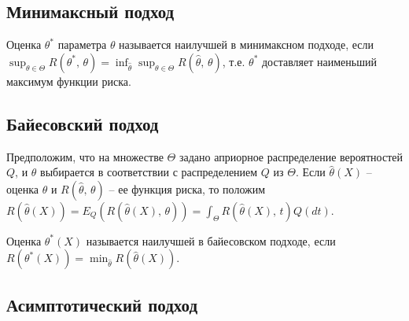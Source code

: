     \subsection{Минимаксный подход}
    \begin{definition}
    Оценка $\displaystyle \theta ^{*}$ параметра $\displaystyle \theta $ называется наилучшей в минимаксном подходе, если $\displaystyle \sup _{\theta \in \Theta } R\left( \theta ^{*} ,\, \theta \right) =\inf_{\hat{\theta }}\sup _{\theta \in \Theta } R(\hat{\theta } ,\, \theta )$, т.е. $\displaystyle \theta ^{*}$ доставляет наименьший максимум функции риска.
    \end{definition}
    \subsection{Байесовский подход}
    
    Предположим, что на множестве $\displaystyle \Theta $ задано априорное распределение вероятностей $\displaystyle Q$, и $\displaystyle \theta $ выбирается в соответствии с распределением $\displaystyle Q$ из $\displaystyle \Theta $. Если $\displaystyle \hat{\theta }( X)$ -- оценка $\displaystyle \theta $ и $\displaystyle R(\hat{\theta },\, \theta )$ -- ее функция риска, то положим $\displaystyle R(\hat{\theta }( X)) =E_{Q}(R(\hat{\theta }( X),\, \theta )) =\int _{\Theta } R(\hat{\theta }( X),\, t) Q( dt)$.
    \begin{definition}
    Оценка $\displaystyle \theta ^{*}( X)$ называется наилучшей в байесовском подходе, если $\displaystyle R\left( \theta ^{*}( X)\right) =\min_{\hat{\theta }} R(\hat{\theta }( X))$.
    \end{definition}
    \subsection{Асимптотический подход}
    
